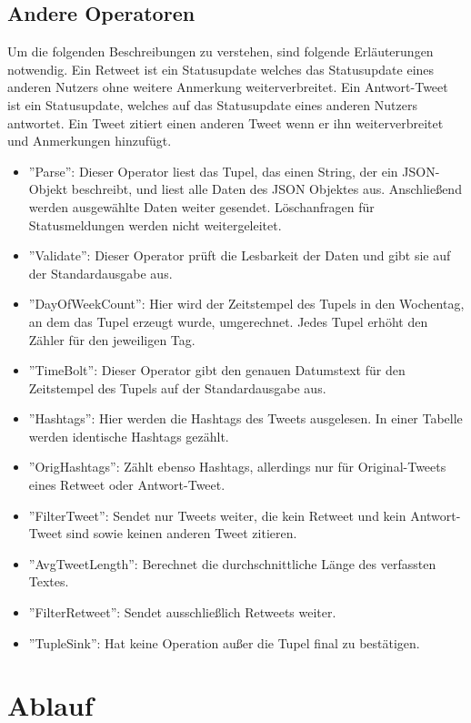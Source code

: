 \subsection{Andere Operatoren}

Um die folgenden Beschreibungen zu verstehen, sind folgende Erläuterungen notwendig.
Ein Retweet ist ein Statusupdate welches das Statusupdate eines anderen Nutzers ohne weitere Anmerkung weiterverbreitet.
Ein Antwort-Tweet ist ein Statusupdate, welches auf das Statusupdate eines anderen Nutzers antwortet.
Ein Tweet zitiert einen anderen Tweet wenn er ihn weiterverbreitet und Anmerkungen hinzufügt.

\begin{itemize}
\item{''Parse'': Dieser Operator liest das Tupel, das einen String, der ein JSON-Objekt beschreibt, und liest alle Daten des JSON Objektes aus. Anschließend werden ausgewählte Daten weiter gesendet. Löschanfragen für Statusmeldungen werden nicht weitergeleitet.}
\item{''Validate'': Dieser Operator prüft die Lesbarkeit der Daten und gibt sie auf der Standardausgabe aus.}
\item{''DayOfWeekCount'': Hier wird der Zeitstempel des Tupels in den Wochentag, an dem das Tupel erzeugt wurde, umgerechnet. Jedes Tupel erhöht den Zähler für den jeweiligen Tag.}
\item{''TimeBolt'': Dieser Operator gibt den genauen Datumstext für den Zeitstempel des Tupels auf der Standardausgabe aus.}
\item{''Hashtags'': Hier werden die Hashtags des Tweets ausgelesen. In einer Tabelle werden identische Hashtags gezählt.}
\item{''OrigHashtags'': Zählt ebenso Hashtags, allerdings nur für Original-Tweets eines Retweet oder Antwort-Tweet.}
\item{''FilterTweet'': Sendet nur Tweets weiter, die kein Retweet und kein Antwort-Tweet sind sowie keinen anderen Tweet zitieren.}
\item{''AvgTweetLength'': Berechnet die durchschnittliche Länge des verfassten Textes.}
\item{''FilterRetweet'': Sendet ausschließlich Retweets weiter.}
\item{''TupleSink'': Hat keine Operation außer die Tupel final zu bestätigen.}
\end{itemize}

\section{Ablauf}

